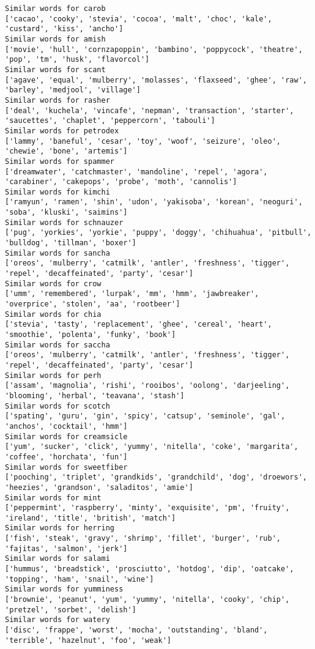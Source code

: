 \documentclass[11pt]{article}
\begin{document}
\begin{Verbatim}[commandchars=\\\{\}]
Similar words for carob
['cacao', 'cooky', 'stevia', 'cocoa', 'malt', 'choc', 'kale', 'custard', 'kiss', 'ancho']
Similar words for amish
['movie', 'hull', 'cornzapoppin', 'bambino', 'poppycock', 'theatre', 'pop', 'tm', 'husk', 'flavorcol']
Similar words for scant
['agave', 'equal', 'mulberry', 'molasses', 'flaxseed', 'ghee', 'raw', 'barley', 'medjool', 'village']
Similar words for rasher
['deal', 'kuchela', 'vincafe', 'nepman', 'transaction', 'starter', 'saucettes', 'chaplet', 'peppercorn', 'tabouli']
Similar words for petrodex
['lammy', 'baneful', 'cesar', 'toy', 'woof', 'seizure', 'oleo', 'chewie', 'bone', 'artemis']
Similar words for spammer
['dreamwater', 'catchmaster', 'mandoline', 'repel', 'agora', 'carabiner', 'cakepops', 'probe', 'moth', 'cannolis']
Similar words for kimchi
['ramyun', 'ramen', 'shin', 'udon', 'yakisoba', 'korean', 'neoguri', 'soba', 'kluski', 'saimins']
Similar words for schnauzer
['pug', 'yorkies', 'yorkie', 'puppy', 'doggy', 'chihuahua', 'pitbull', 'bulldog', 'tillman', 'boxer']
Similar words for sancha
['oreos', 'mulberry', 'catmilk', 'antler', 'freshness', 'tigger', 'repel', 'decaffeinated', 'party', 'cesar']
Similar words for crow
['umm', 'remembered', 'lurpak', 'mm', 'hmm', 'jawbreaker', 'overprice', 'stolen', 'aa', 'rootbeer']
Similar words for chia
['stevia', 'tasty', 'replacement', 'ghee', 'cereal', 'heart', 'smoothie', 'polenta', 'funky', 'book']
Similar words for saccha
['oreos', 'mulberry', 'catmilk', 'antler', 'freshness', 'tigger', 'repel', 'decaffeinated', 'party', 'cesar']
Similar words for perh
['assam', 'magnolia', 'rishi', 'rooibos', 'oolong', 'darjeeling', 'blooming', 'herbal', 'teavana', 'stash']
Similar words for scotch
['spating', 'guru', 'gin', 'spicy', 'catsup', 'seminole', 'gal', 'anchos', 'cocktail', 'hmm']
Similar words for creamsicle
['yum', 'sucker', 'click', 'yummy', 'nitella', 'coke', 'margarita', 'coffee', 'horchata', 'fun']
Similar words for sweetfiber
['pooching', 'triplet', 'grandkids', 'grandchild', 'dog', 'droewors', 'heezies', 'grandson', 'saladitos', 'amie']
Similar words for mint
['peppermint', 'raspberry', 'minty', 'exquisite', 'pm', 'fruity', 'ireland', 'title', 'british', 'match']
Similar words for herring
['fish', 'steak', 'gravy', 'shrimp', 'fillet', 'burger', 'rub', 'fajitas', 'salmon', 'jerk']
Similar words for salami
['hummus', 'breadstick', 'prosciutto', 'hotdog', 'dip', 'oatcake', 'topping', 'ham', 'snail', 'wine']
Similar words for yumminess
['brownie', 'peanut', 'yum', 'yummy', 'nitella', 'cooky', 'chip', 'pretzel', 'sorbet', 'delish']
Similar words for watery
['disc', 'frappe', 'worst', 'mocha', 'outstanding', 'bland', 'terrible', 'hazelnut', 'foo', 'weak']

\end{Verbatim}
\end{document}
